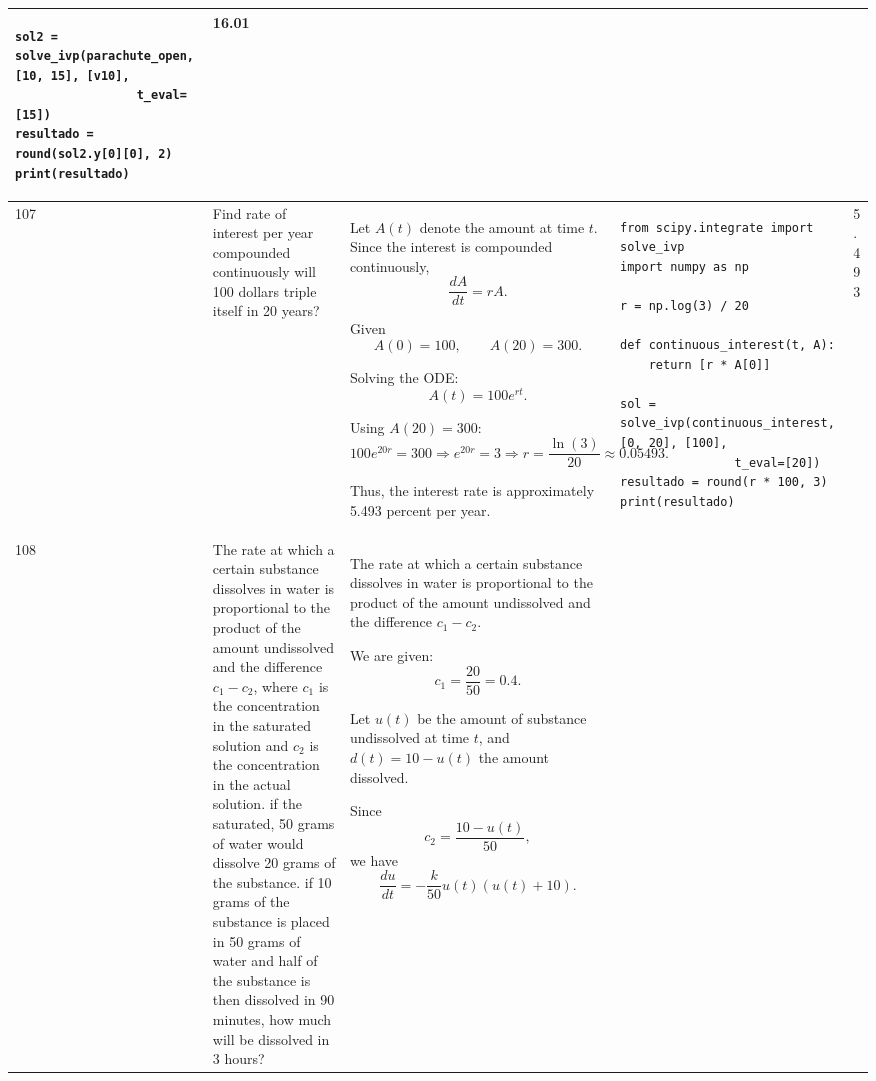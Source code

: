 \documentclass[a4paper,12pt]{article}
\begin{document}
\begin{longtable}{|p{0.3cm}|p{}|p{10cm}|p{}|p{1.5cm}|}
\begin{verbatim}
sol2 = solve_ivp(parachute_open, [10, 15], [v10],
                 t_eval=[15])
resultado = round(sol2.y[0][0], 2)
print(resultado)
\end{verbatim}
& 16.01 \\ \hline

107 & Find rate of interest per year compounded continuously will 100 dollars triple itself in 20 years? &
Let \(A(t)\) denote the amount at time \(t\). Since the interest is compounded continuously,
\[
\frac{dA}{dt}=rA.
\]

Given
\[
A(0)=100,\qquad A(20)=300.
\]

Solving the ODE:
\[
A(t)=100e^{rt}.
\]

Using \(A(20)=300\):
\[
100e^{20r}=300
\Rightarrow e^{20r}=3
\Rightarrow r=\frac{\ln(3)}{20}
\approx0.05493.
\]

Thus, the interest rate is approximately 5.493 percent per year. &
\begin{verbatim}
from scipy.integrate import solve_ivp
import numpy as np

r = np.log(3) / 20

def continuous_interest(t, A):
    return [r * A[0]]

sol = solve_ivp(continuous_interest, [0, 20], [100],
                t_eval=[20])
resultado = round(r * 100, 3)
print(resultado)
\end{verbatim}
& 5.493 \\ \hline

108 & The rate at which a certain substance dissolves in water is proportional to the product of the amount undissolved and the difference $c_1-c_2$, where $c_1$ is the concentration in the saturated solution and $c_2$ is the concentration in the actual solution. if the saturated, 50 grams of water would dissolve 20 grams of the substance. if 10 grams of the substance is placed in 50 grams of water and half of the substance is then dissolved in 90 minutes, how much will be dissolved in 3 hours? &
The rate at which a certain substance dissolves in water is proportional to the product of the amount undissolved and the difference \(c_1-c_2\).

We are given:
\[
c_1=\frac{20}{50}=0.4.
\]

Let \(u(t)\) be the amount of substance undissolved at time \(t\), and \(d(t)=10-u(t)\) the amount dissolved.

Since
\[
c_2=\frac{10-u(t)}{50},
\]
we have
\[
\frac{du}{dt}
=-\frac{k}{50}u(t)(u(t)+10).
\]


\end{longtable}
\end{document}
